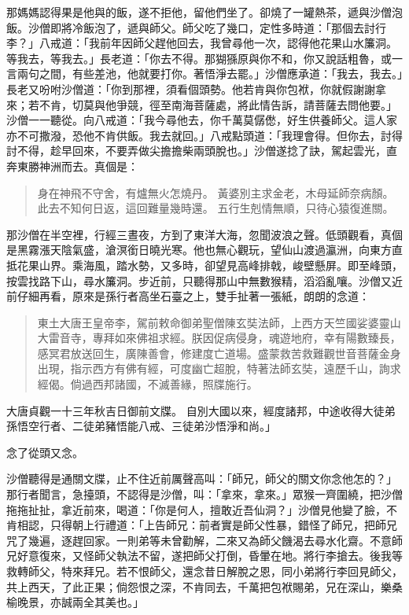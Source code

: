 那媽媽認得果是他與的飯，遂不拒他，留他們坐了。卻燒了一罐熱茶，遞與沙僧泡飯。沙僧即將冷飯泡了，遞與師父。師父吃了幾口，定性多時道：「那個去討行李？」八戒道：「我前年因師父趕他回去，我曾尋他一次，認得他花果山水簾洞。等我去，等我去。」長老道：「你去不得。那猢猻原與你不和，你又說話粗魯，或一言兩句之間，有些差池，他就要打你。著悟淨去罷。」沙僧應承道：「我去，我去。」長老又吩咐沙僧道：「你到那裡，須看個頭勢。他若肯與你包袱，你就假謝謝拿來；若不肯，切莫與他爭競，徑至南海菩薩處，將此情告訴，請菩薩去問他要。」沙僧一一聽從。向八戒道：「我今尋他去，你千萬莫僝僽，好生供養師父。這人家亦不可撒潑，恐他不肯供飯。我去就回。」八戒點頭道：「我理會得。但你去，討得討不得，趁早回來，不要弄做尖擔擔柴兩頭脫也。」沙僧遂捻了訣，駕起雲光，直奔東勝神洲而去。真個是：
\begin{quote}
身在神飛不守舍，有爐無火怎燒丹。
黃婆別主求金老，木母延師奈病顏。
此去不知何日返，這回難量幾時還。
五行生剋情無順，只待心猿復進關。
\end{quote}

那沙僧在半空裡，行經三晝夜，方到了東洋大海，忽聞波浪之聲。低頭觀看，真個是黑霧漲天陰氣盛，滄溟銜日曉光寒。他也無心觀玩，望仙山渡過瀛洲，向東方直抵花果山界。乘海風，踏水勢，又多時，卻望見高峰排戟，峻壁懸屏。即至峰頭，按雲找路下山，尋水簾洞。步近前，只聽得那山中無數猴精，滔滔亂嚷。沙僧又近前仔細再看，原來是孫行者高坐石臺之上，雙手扯著一張紙，朗朗的念道：
\begin{quote}
東土大唐王皇帝李，駕前敕命御弟聖僧陳玄奘法師，上西方天竺國娑婆靈山大雷音寺，專拜如來佛祖求經。朕因促病侵身，魂遊地府，幸有陽數臻長，感冥君放送回生，廣陳善會，修建度亡道場。盛蒙救苦救難觀世音菩薩金身出現，指示西方有佛有經，可度幽亡超脫，特著法師玄奘，遠歷千山，詢求經偈。倘過西邦諸國，不滅善緣，照牒施行。
\end{quote}

大唐貞觀一十三年秋吉日御前文牒。
自別大國以來，經度諸邦，中途收得大徒弟孫悟空行者、二徒弟豬悟能八戒、三徒弟沙悟淨和尚。」

念了從頭又念。

沙僧聽得是通關文牒，止不住近前厲聲高叫：「師兄，師父的關文你念他怎的？」那行者聞言，急擡頭，不認得是沙僧，叫：「拿來，拿來。」眾猴一齊圍繞，把沙僧拖拖扯扯，拿近前來，喝道：「你是何人，擅敢近吾仙洞？」沙僧見他變了臉，不肯相認，只得朝上行禮道：「上告師兄：前者實是師父性暴，錯怪了師兄，把師兄咒了幾遍，逐趕回家。一則弟等未曾勸解，二來又為師父饑渴去尋水化齋。不意師兄好意復來，又怪師父執法不留，遂把師父打倒，昏暈在地。將行李搶去。後我等救轉師父，特來拜兄。若不恨師父，還念昔日解脫之恩，同小弟將行李回見師父，共上西天，了此正果；倘怨恨之深，不肯同去，千萬把包袱賜弟，兄在深山，樂桑榆晚景，亦誠兩全其美也。」

